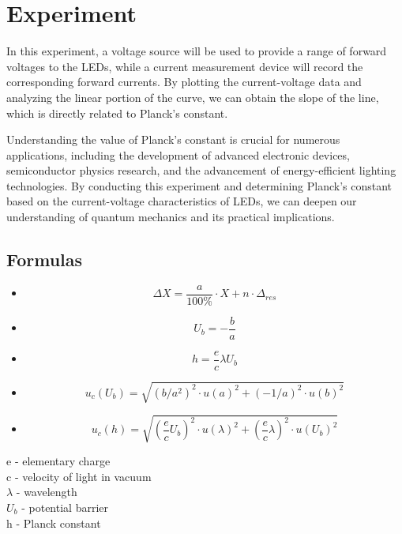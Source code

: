 \section{Experiment}
In this experiment, a voltage source will be used to provide a range of forward voltages to the LEDs, while a current measurement device will record the corresponding forward currents. By plotting the current-voltage data and analyzing the linear portion of the curve, we can obtain the slope of the line, which is directly related to Planck's constant.

Understanding the value of Planck's constant is crucial for numerous applications, including the development of advanced electronic devices, semiconductor physics research, and the advancement of energy-efficient lighting technologies. By conducting this experiment and determining Planck's constant based on the current-voltage characteristics of LEDs, we can deepen our understanding of quantum mechanics and its practical implications.
\subsection{Formulas}
\large
\begin{itemize}
\item \begin{equation*}
	\Delta X = \frac{a}{100\%} \cdot X + n \cdot \Delta_{res}
\end{equation*}
\item \begin{equation*}
	U_b = - \frac{b}{a} 
\end{equation*}

\item \begin{equation*}
	h = \frac{e}{c}\lambda U_b
\end{equation*}
\item \begin{equation*}
	u_c(U_b) = \sqrt{(b/a^2)^2 \cdot u(a)^2 + (-1/a)^2 \cdot u(b)^2}
\end{equation*}

\item \begin{equation*}
	u_c(h) = \sqrt{(\frac{e}{c} U_b)^2 \cdot u(\lambda)^2 + (\frac{e}{c} \lambda )^2 \cdot u(U_b)^2}
\end{equation*}
\end{itemize} 

e - elementary charge \\
c - velocity of light in vacuum \\
$\lambda$ - wavelength \\
$U_b$ - potential barrier \\
h - Planck constant \\
